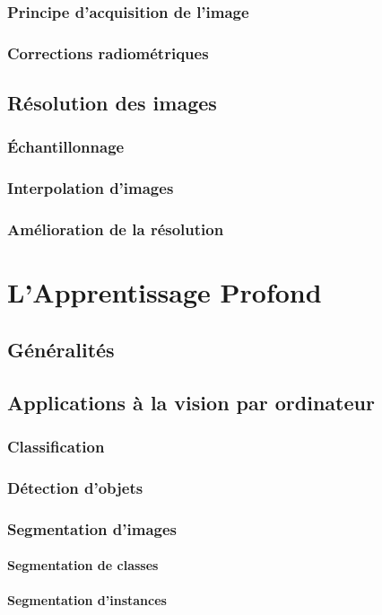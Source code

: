 \documentclass[10pt,a4paper]{report}
\begin{document}
			\subsection{Principe d'acquisition de l'image}
			\subsection{Corrections radiométriques}
		\section{Résolution des images}
			\subsection{Échantillonnage}
			\subsection{Interpolation d'images}
			\subsection{Amélioration de la résolution}
	\chapter{L'Apprentissage Profond}
		\section{Généralités}
		\section{Applications à la vision par ordinateur}
			\subsection{Classification}
			\subsection{Détection d'objets}
			\subsection{Segmentation d'images}
				\subsubsection{Segmentation de classes}
				\subsubsection{Segmentation d'instances}
\end{document}
